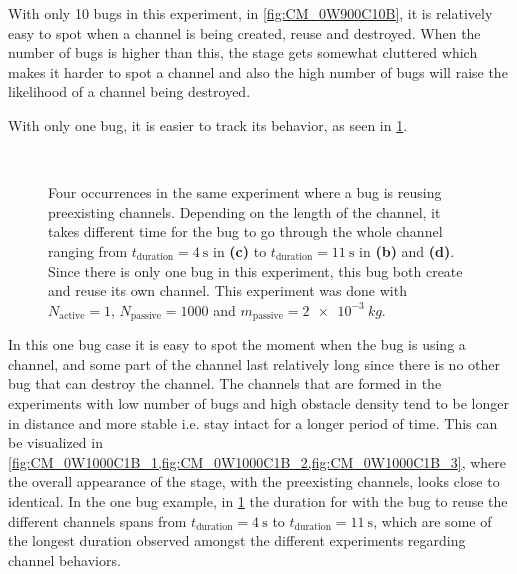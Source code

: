 With only 10 bugs in this experiment, in \cref{fig:CM_0W900C10B}, 
it is relatively easy to spot when a channel is being created, 
reuse and destroyed. When the number of bugs is higher than this, the 
stage gets somewhat cluttered which makes it harder to spot a channel 
and also the high number of bugs will raise the likelihood of a channel being destroyed.

With only one bug, it is easier to track its behavior, as seen in \cref{fig:CM_0W1000C1B}.

\begin{figure}[htpb!]
\centering
{}\quad
{}\\
\quad
{}
\caption{Four occurrences in the same experiment where a bug is reusing preexisting channels. 
Depending on the length of the channel, it takes different time for the bug to go through 
the whole channel ranging from $t_{\text{duration}}=\SI{4}{\second}$ in \textbf{(c)} to 
$t_{\text{duration}}=\SI{11}{\second}$ in \textbf{(b)} and \textbf{(d)}.
Since there is only one bug in this experiment, this bug both create and reuse its own channel.
This experiment was done with $N_{\text{active}}=1$, $N_{\text{passive}}=1000$ and 
$m_{\text{passive}}=\SI{2e-3}{kg}$.} 
\label{fig:CM_0W1000C1B}
\end{figure}

In this one bug case it is easy to spot the 
moment when the bug is using a channel, 
and some part of the channel last relatively 
long since there is no other bug that can 
destroy the channel. The channels that are 
formed in the experiments with low number of bugs 
and high obstacle density tend to be longer in distance 
and more stable i.e. stay intact for a longer period of time. 
This can be visualized in \cref{fig:CM_0W1000C1B_1,fig:CM_0W1000C1B_2,fig:CM_0W1000C1B_3}, 
where the overall appearance of the stage, with the preexisting channels, looks 
close to identical. In the one bug example, in \cref{fig:CM_0W1000C1B} the duration 
for with the bug to reuse the different channels spans from $t_{\text{duration}}=\SI{4}{\second}$ 
to $t_{\text{duration}}=\SI{11}{\second}$, which are some of the longest duration observed 
amongst the different experiments regarding channel behaviors.

